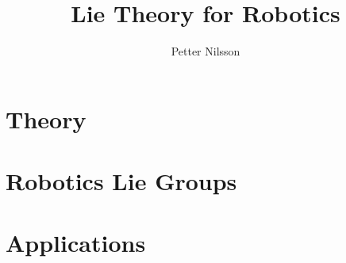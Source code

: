 \documentclass{scrbook}
\title{Lie Theory for Robotics}
\author{Petter Nilsson}
\begin{document}
\frontmatter

\maketitle

\tableofcontents

\mainmatter



\part{Theory}










\part{Robotics Lie Groups}







\part{Applications}








\backmatter

\printbibliography

% 

\end{document}
